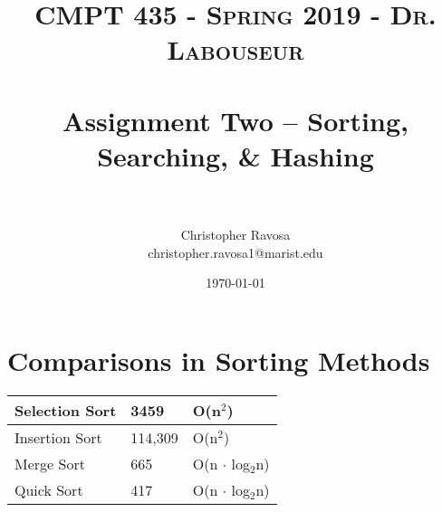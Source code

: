 \documentclass[letterpaper, 10pt]{article}
\title{	
   \normalfont \normalsize 
   \textsc{CMPT 435 - Spring 2019 - Dr. Labouseur} \\[10pt] %
   \horrule{0.5pt} \\[0.25cm] 	%
   \huge Assignment Two -- Sorting, Searching, \& Hashing \\   %
   \horrule{0.5pt} \\[0.25cm] 	%
}
\author{Christopher Ravosa \\ \normalsize christopher.ravosa1@marist.edu}
\date{\normalsize\today} %
\begin{document}
\maketitle %

\section{Comparisons in Sorting Methods}
\begin{tabu} to 0.8\textwidth { | X[l] | X[c] | X[r] | }
 \hline
 Selection Sort & 3459 & O(n$^{2}$)\\
 \hline
 Insertion Sort  & 114,309 & O(n$^{2}$) \\
\hline
 Merge Sort  & 665 & O(n $\cdot$ log$_{2}$n) \\
\hline
 Quick Sort  & 417 & O(n $\cdot$ log$_{2}$n) \\
\hline
\end{tabu}
\end{document}

